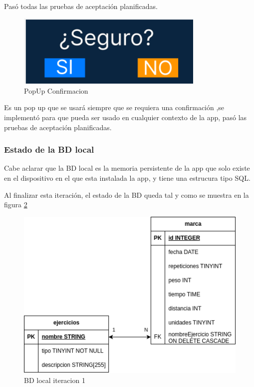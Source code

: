 Pasó todas las pruebas de aceptación planificadas.


\vspace{1cm}



\begin{figure}[H]
   \centering
    \includegraphics[width=0.8\textwidth]{pantallas/PopUpConfirmacion.png}
    \caption{PopUp Confirmacion}
    \label{fig:PopUpConfirmacion}
\end{figure}

Es un pop up que se usará siempre que se requiera una confirmación ,se implementó para que pueda ser usado en cualquier contexto de la app, pasó las pruebas de aceptación planificadas.

\subsubsection{Estado de la BD local}

Cabe aclarar que la BD local es la memoria persistente de la app que solo existe en el dispositivo en el que esta instalada la app, y tiene una estrucura tipo SQL.

Al finalizar esta iteración, el estado de la BD queda tal y como se muestra en la figura \cref{fig:BD local iteracion 1}
\begin{figure}[H]
   \centering
    \includegraphics[width=\textwidth]{fotos/BDL iteracion 1.png}
    \caption{BD local iteracion 1}
    \label{fig:BD local iteracion 1}
\end{figure}

